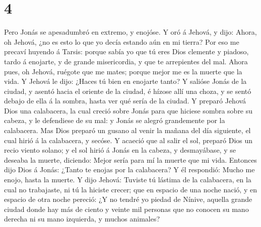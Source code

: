 \hypertarget{section-3}{%
\section{4}\label{section-3}}

 Pero Jonás se apesadumbró en extremo, y enojóse.
 Y oró á Jehová, y dijo: Ahora, oh Jehová, ¿no es esto lo
que yo decía estando aún en mi tierra? Por eso me precaví huyendo á
Tarsis: porque sabía yo que tú eres Dios clemente y piadoso, tardo á
enojarte, y de grande misericordia, y que te arrepientes del mal.
 Ahora pues, oh Jehová, ruégote que me mates; porque mejor
me es la muerte que la vida.  Y Jehová le dijo: ¿Haces tú
bien en enojarte tanto?  Y salióse Jonás de la ciudad, y
asentó hacia el oriente de la ciudad, é hízose allí una choza, y se
sentó debajo de ella á la sombra, hasta ver qué sería de la ciudad.
 Y preparó Jehová Dios una calabacera, la cual creció
sobre Jonás para que hiciese sombra sobre su cabeza, y le defendiese de
su mal: y Jonás se alegró grandemente por la calabacera. 
Mas Dios preparó un gusano al venir la mañana del día siguiente, el cual
hirió á la calabacera, y secóse.  Y acaeció que al salir
el sol, preparó Dios un recio viento solano; y el sol hirió á Jonás en
la cabeza, y desmayábase, y se deseaba la muerte, diciendo: Mejor sería
para mí la muerte que mi vida.  Entonces dijo Dios á
Jonás: ¿Tanto te enojas por la calabacera? Y él respondió: Mucho me
enojo, hasta la muerte.  Y dijo Jehová: Tuviste tú
lástima de la calabacera, en la cual no trabajaste, ni tú la hiciste
crecer; que en espacio de una noche nació, y en espacio de otra noche
pereció:  ¿Y no tendré yo piedad de Nínive, aquella
grande ciudad donde hay más de ciento y veinte mil personas que no
conocen su mano derecha ni su mano izquierda, y muchos animales?
